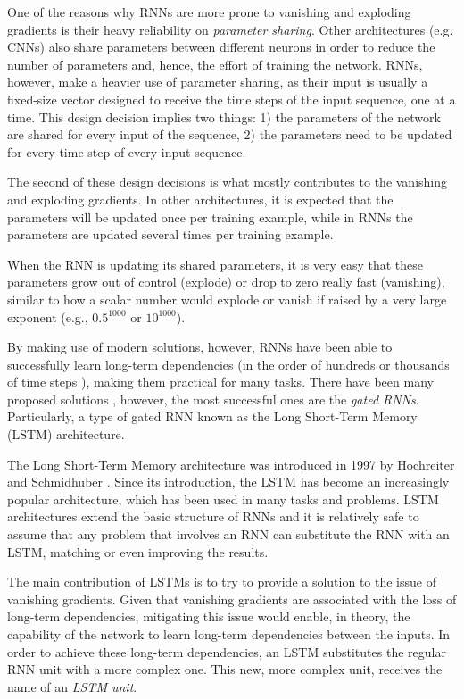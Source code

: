 One of the reasons why RNNs are more prone to vanishing and exploding gradients is their heavy reliability on \emph{parameter sharing}. Other architectures (e.g. CNNs) also share parameters between different neurons in order to reduce the number of parameters and, hence, the effort of training the network. RNNs, however, make a heavier use of parameter sharing, as their input is usually a fixed-size vector designed to receive the time steps of the input sequence, one at a time. This design decision implies two things: 1) the parameters of the network are shared for every input of the sequence, 2) the parameters need to be updated for every time step of every input sequence.

The second of these design decisions is what mostly contributes to the vanishing and exploding gradients. In other architectures, it is expected that the parameters will be updated once per training example, while in RNNs the parameters are updated several times per training example. 

When the RNN is updating its shared parameters, it is very easy that these parameters grow out of control (explode) or drop to zero really fast (vanishing), similar to how a scalar number would explode or vanish if raised by a very large exponent (e.g., $0.5^{1000}$ or $10^{1000}$).

By making use of modern solutions, however, RNNs have been able to successfully learn long-term dependencies (in the order of hundreds or thousands of time steps \cite{hochreiter1997long}), making them practical for many tasks. There have been many proposed solutions \cite{elhihi1995hierarchical, yildiz2012revisiting, jaeger2012long}, however, the most successful ones are the \emph{gated RNNs}. Particularly, a type of gated RNN known as the Long Short-Term Memory (LSTM) architecture.


The Long Short-Term Memory architecture was introduced in 1997 by Hochreiter and Schmidhuber \cite{hochreiter1997long}. Since its introduction, the LSTM has become an increasingly popular architecture, which has been used in many tasks and problems. LSTM architectures extend the basic structure of RNNs and it is relatively safe to assume that any problem that involves an RNN can substitute the RNN with an LSTM, matching or even improving the results.

The main contribution of LSTMs is to try to provide a solution to the issue of vanishing gradients. Given that vanishing gradients are associated with the loss of long-term dependencies, mitigating this issue would enable, in theory, the capability of the network to learn long-term dependencies between the inputs. In order to achieve these long-term dependencies, an LSTM substitutes the regular RNN unit with a more complex one. This new, more complex unit, receives the name of an \emph{LSTM unit}.

